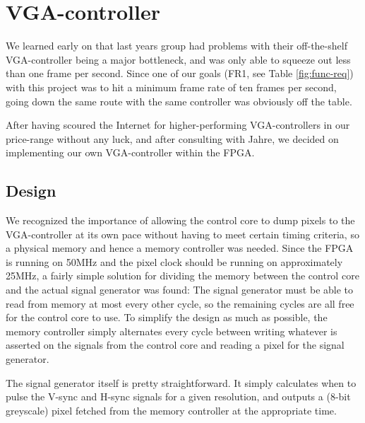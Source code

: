 \section{VGA-controller}

We learned early on that last years group had problems with their off-the-shelf
\ac{VGA}-controller being a major bottleneck, and was only able to squeeze out less
than one frame per second. Since one of our goals ({\sc FR1}, see Table
\ref{fig:func-req}) with this project was to hit a minimum frame rate of ten
frames per second, going down the same route with the same controller was
obviously off the table.

After having scoured the Internet for higher-performing \ac{VGA}-controllers in our
price-range without any luck, and after consulting with Jahre, we decided on
implementing our own \ac{VGA}-controller within the \ac{FPGA}.



\subsection{Design}
We recognized the importance of allowing the control core to dump pixels to the
\ac{VGA}-controller at its own pace without having to meet certain timing criteria,
so a physical memory and hence a memory controller was needed. Since the \ac{FPGA}
is running on 50MHz and the pixel clock should be running on approximately
25MHz, a fairly simple solution for dividing the memory between the control
core and the actual signal generator was found: The signal generator must be
able to read from memory at most every other cycle, so the remaining cycles are
all free for the control core to use. To simplify the design as much as
possible, the memory controller simply alternates every cycle between writing
whatever is asserted on the signals from the control core and reading a pixel
for the signal generator.

The signal generator itself is pretty straightforward. It simply calculates
when to pulse the V-sync and H-sync signals for a given resolution, and outputs
a (8-bit greyscale) pixel fetched from the memory controller at the appropriate
time.

